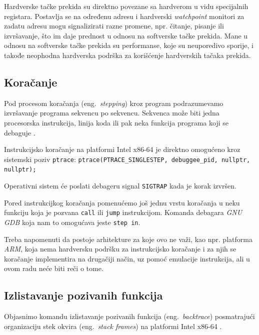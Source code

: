 \documentclass[12pt,oneside]{memoir}
\begin{document}
Hardverske tačke prekida su direktno povezane sa hardverom u vidu specijalnih registara. Postavlja se na određenu adresu i hardverski \emph{watchpoint} monitori za zadatu adresu mogu signalizirati razne promene, npr. čitanje, pisanje ili izvršavanje, što im daje prednost u odnosu na softverske tačke prekida. Mane u odnosu na softverske tačke prekida su performanse, koje su neuporedivo sporije, i takođe neophodna hardverska podrška za korišćenje hardverskih tačaka prekida.

\subsection{Koračanje}

Pod procesom koračanja (eng.~\emph{stepping}) kroz program podrazumevamo izvršavanje programa sekvencu po sekvencu. Sekvenca može biti jedna procesorska instrukcija, linija koda ili pak neka funkcija programa koji se debaguje \cite{GDB}.

Instrukcijsko koračanje na platformi Intel x86-64 je direktno omogućeno kroz sistemski poziv \texttt{ptrace}:\newline\newline
\texttt{ptrace(PTRACE\_SINGLESTEP, debuggee\_pid, nullptr, nullptr);}
\newline

Operativni sistem će poslati debageru signal \texttt{SIGTRAP} kada je korak izvršen.

Pored instrukcijkog koračanja pomenućemo još jednu vrstu koračanja u neku funkciju koja je pozvana \texttt{call} ili \texttt{jump} instrukcijom. Komanda debagara \emph{GNU GDB} koja nam to omogućava jeste \texttt{step in}.

Treba napomenuti da postoje arhitekture za koje ovo ne važi, kao npr. platforma \emph{ARM}, koja nema hardversku podršku za instrukcijsko koračanje i za njih se koračanje implementira na drugačiji način, uz pomoć emulacije instrukcija, ali u ovom radu neće biti reči o tome.

\subsection{Izlistavanje pozivanih funkcija}

Objasnimo komandu izlistavanje pozivanih funkcija (eng.~\emph{backtrace}) posmatrajući organizaciju stek okvira (eng.~\emph{stack frames}) na platformi Intel x86-64 \cite{GDB}.
\end{document}
